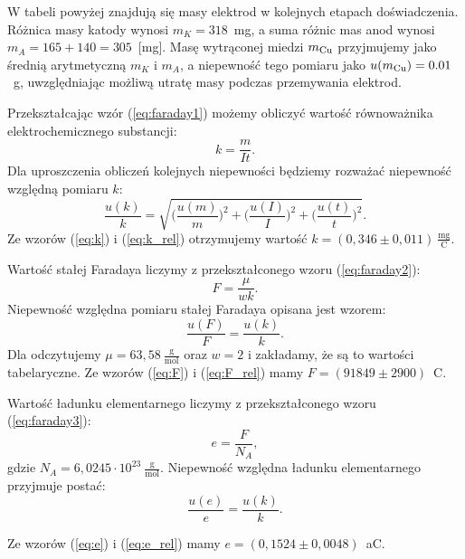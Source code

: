 \documentclass[12pt,a4paper]{article}
\numberwithin{equation}{section}
\begin{document}
W tabeli powyżej znajdują się masy elektrod w kolejnych etapach doświadczenia. Różnica masy katody wynosi $m_K = 318$~mg, a suma różnic mas anod wynosi $m_A = 165 + 140 = 305$~[mg]. Masę wytrąconej miedzi $m_{\ce{Cu}}$ przyjmujemy jako średnią arytmetyczną $m_K$ i $m_A$, a niepewność tego pomiaru jako $u(m_{\ce{Cu}}) = 0.01$~g, uwzględniając możliwą utratę masy podczas przemywania elektrod.

Przekształcając wzór (\ref{eq:faraday1}) możemy obliczyć wartość równoważnika elektrochemicznego substancji:
\begin{equation}
	k = \frac{m}{It}.
	\label{eq:k}
\end{equation}
Dla uproszczenia obliczeń kolejnych niepewności będziemy rozważać niepewność względną pomiaru $k$:
\begin{equation}
	\frac{u(k)}{k} = \sqrt{\Bigg(\frac{u(m)}{m}\Bigg)^2 + \Bigg(\frac{u(I)}{I}\Bigg)^2 + \Bigg(\frac{u(t)}{t}\Bigg)^2}.
	\label{eq:k_rel}
\end{equation}
Ze wzorów (\ref{eq:k}) i (\ref{eq:k_rel}) otrzymujemy wartość $k = (0,346 \pm 0,011)~\frac{\textrm{mg}}{\textrm{C}}$.

Wartość stałej Faradaya liczymy z przekształconego wzoru (\ref{eq:faraday2}):
\begin{equation}
	F = \frac{\mu}{wk}.
	\label{eq:F}
\end{equation}
Niepewność względna pomiaru stałej Faradaya opisana jest wzorem:
\begin{equation}
	\frac{u(F)}{F} = \frac{u(k)}{k}.
	\label{eq:F_rel}
\end{equation}
Dla  odczytujemy $\mu = 63,58~\frac{\textrm{g}}{\textrm{mol}}$ oraz $w = 2$ i zakładamy, że  są to wartości tabelaryczne. Ze wzorów (\ref{eq:F}) i (\ref{eq:F_rel}) mamy $F = (91849 \pm 2900)$~C.

Wartość ładunku elementarnego liczymy z przekształconego wzoru (\ref{eq:faraday3}):
\begin{equation}
	e = \frac{F}{N_A},
	\label{eq:e}
\end{equation}
gdzie $N_A = 6,0245 \cdot 10^{23}~\frac{\textrm{g}}{\textrm{mol}}$.
Niepewność względna ładunku elementarnego przyjmuje postać:
\begin{equation}
	\frac{u(e)}{e} = \frac{u(k)}{k}.
	\label{eq:e_rel}
\end{equation}

Ze wzorów (\ref{eq:e}) i (\ref{eq:e_rel}) mamy $e = (0,1524 \pm 0,0048)$~aC.
\end{document}
